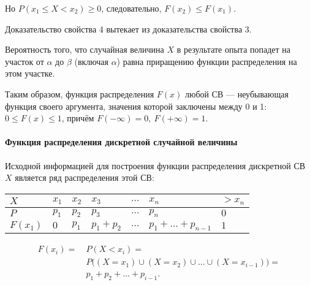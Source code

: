 \documentclass[a4paper]{article}
\makeatletter
\newcommand{\sleq}{\leqslant}
\newcommand{\sgeq}{\geqslant}
\renewcommand{\qedsymbol}{\ensuremath{\blacksquare}}
\newcommand{\qeddnostar}{\hfill{\color{Dark}\qedsymbol}}
\newcommand{\qeddstar}[1]{\hfill{\color{Dark}\raisebox{#1}{\qedsymbol}}}
\newcommand\qedd{\@ifstar\qeddstar\qeddnostar}
\makeatother
\begin{document}
                    Но $P(x_1 \sleq X < x_2) \sgeq 0$, следовательно, $F(x_2) \sleq F(x_1)$. \qedd

                    Доказательство свойства 4 вытекает из доказательства свойства 3.

                    Вероятность того, что случайная величина $X$ в результате опыта попадет на участок от $\alpha$ до $\beta$ (включая $\alpha$) равна приращению функции распределения на этом участке.
                    
                    Таким образом, функция распределения $F(x)$ любой СВ --- неубывающая функция своего аргумента, значения которой заключены между 0 и 1: \newline
                    $0 \sleq F(x) \sleq 1$, причём $F(-\infty) = 0 , \: F(+\infty) = 1$.

                \paragraph{Функция распределения дискретной случайной величины}

                    Исходной информацией для построения функции распределения дискретной СВ $X$ является ряд распределения этой СВ:

                    \begin{tabular}{*{5}{|C{1.6cm}}|C{2.8cm}|C{1.8cm}|}
                        \hline
                        $X$ & $x_1$ & $x_2$ & $x_3$ & $\ldots$ & $x_n$ & $> x_n$ \\
                        \hline
                        $P $ & $p_1$ & $p_2$ & $p_3$ & $\ldots$ & $p_n$ & $0$ \\
                        \hline
                        $F(x_1)$ & $0$ & $p_1$ & $p_1 + p_2$ & $\ldots$ &
                            $p_1 + \ldots + p_{n - 1}$ & $1$ \\
                        \hline
                    \end{tabular}
                    \begin{equation*}
                        \begin{aligned}
                            F(x_i) = ~& P(X < x_i) = \\[1.0ex]
                            & P \big( (X = x_1) \cup (X = x_2) \cup \ldots \cup
                                (X = x_{i - 1}) \big) = \\[1.0ex]
                            & p_1 + p_2 + \ldots + p_{i - 1} .
                        \end{aligned}
                    \end{equation*}
\end{document}

